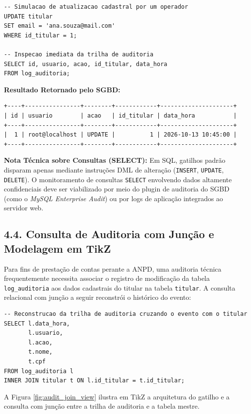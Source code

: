 \begin{lstlisting}
-- Simulacao de atualizacao cadastral por um operador
UPDATE titular
SET email = 'ana.souza@mail.com'
WHERE id_titular = 1;

-- Inspecao imediata da trilha de auditoria
SELECT id, usuario, acao, id_titular, data_hora
FROM log_auditoria;
\end{lstlisting}

\textbf{Resultado Retornado pelo SGBD:}
\begin{lstlisting}
+----+----------------+--------+------------+---------------------+
| id | usuario        | acao   | id_titular | data_hora           |
+----+----------------+--------+------------+---------------------+
|  1 | root@localhost | UPDATE |          1 | 2026-10-13 10:45:00 |
+----+----------------+--------+------------+---------------------+
\end{lstlisting}

\noindent \textbf{Nota Técnica sobre Consultas (SELECT):} Em SQL, gatilhos padrão disparam apenas mediante instruções DML de alteração (\texttt{INSERT}, \texttt{UPDATE}, \texttt{DELETE}). O monitoramento de consultas \texttt{SELECT} envolvendo dados altamente confidenciais deve ser viabilizado por meio do plugin de auditoria do SGBD (como o \textit{MySQL Enterprise Audit}) ou por logs de aplicação integrados ao servidor web.

\subsection*{4.4. Consulta de Auditoria com Junção e Modelagem em TikZ}

Para fins de prestação de contas perante a ANPD, uma auditoria técnica frequentemente necessita associar o registro de modificação da tabela \texttt{log\_auditoria} aos dados cadastrais do titular na tabela \texttt{titular}. A consulta relacional com junção a seguir reconstrói o histórico do evento:

\begin{lstlisting}
-- Reconstrucao da trilha de auditoria cruzando o evento com o titular
SELECT l.data_hora,
       l.usuario,
       l.acao,
       t.nome,
       t.cpf
FROM log_auditoria l
INNER JOIN titular t ON l.id_titular = t.id_titular;
\end{lstlisting}

A Figura \ref{fig:audit_join_view} ilustra em TikZ a arquitetura do gatilho e a consulta com junção entre a trilha de auditoria e a tabela mestre.

